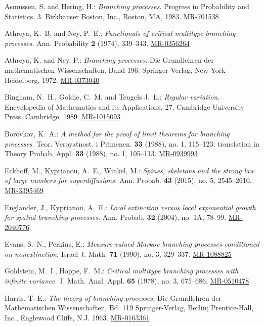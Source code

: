 \documentclass[12pt, a4paper]{amsart}
\def\MR#1{\href{http://www.ams.org/mathscinet-getitem?mr=#1}{MR-#1}}
\theoremstyle{definition}
\numberwithin{equation}{section}
\begin{document}
\begin{thebibliography}{10}
	
	Asmussen, S. and Hering, H.: 
	\emph{Branching processes}. 
	Progress in Probability and Statistics, 3. 
	Birkh{\"a}user Boston, Inc., Boston, MA, 1983.
	\MR{701538}
	
	Athreya, K.~B. and Ney, P.~E.:
	\emph{Functionals of critical multitype branching processes}. 
	Ann. Probability \textbf{2} (1974), 339--343. \MR{0356264}
	
	Athreya, K. and Ney, P.: 
	\emph{Branching processes}. 
	Die Grundlehren der mathematischen Wissenschaften, Band 196.
	Springer-Verlag, New York-Heidelberg, 1972. 
	\MR{0373040}
	
	Bingham, N.~H., Goldie, C.~M. and Teugels J.~L.:
	\emph{Regular variation}.
	Encyclopedia of Mathematics and its Applications, 27. 
	Cambridge University Press, Cambridge, 1989. 
	\MR{1015093}
	
	Borovkov, K.~A.: 
	\emph{A method for the proof of limit theorems for branching processes}.
	Teor. Veroyatnost. i Primenen. \textbf{33} (1988), no. 1, 115--123;
	translation in Theory Probab. Appl. \textbf{33} (1988), no. 1, 105–113.
	\MR{0939993}
	
	Eckhoff, M., Kyprianou, A.~E., Winkel, M.:
	\emph{Spines, skeletons and the strong law of large numbers for superdiffusions.}
	Ann. Probab. \textbf{43} (2015), no. 5, 2545–2610.
	\MR{3395469}
	
	Engländer, J., Kyprianou, A.~E.:
	\emph{Local extinction versus local exponential growth for spatial branching processes.}
	Ann. Probab. \textbf{32} (2004), no. 1A, 78–99.
	\MR{2040776}
	
	Evans, S.~N., Perkins, E.:
	\emph{Measure-valued Markov branching processes conditioned on nonextinction.}
	Israel J. Math. \textbf{71} (1990), no. 3, 329–337. 
	\MR{1088825}
	
	Goldstein, M.~I., Hoppe, F.~M.:
	\emph{Critical multitype branching processes with infinite variance.}
	J. Math. Anal. Appl. \textbf{65} (1978), no. 3, 675–686. 
	\MR{0510478}
	
	Harris, T. E.:
	\emph{The theory of branching processes.}
	Die Grundlehren der Mathematischen Wissenschaften, Bd. 119 Springer-Verlag, Berlin; Prentice-Hall, Inc., Englewood Cliffs, N.J. 1963.
	\MR{0163361}
	

\end{thebibliography}
\end{document}
